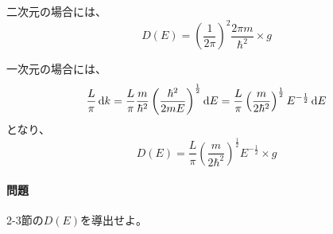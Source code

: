 \documentclass[titlepage]{ltjsarticle}
\begin{document}
二次元の場合には、
\begin{equation}
  D(E) = \left( \frac{1}{2\pi} \right)^2 \frac{2\pi m}{\hbar^2} \times g 
\end{equation}

一次元の場合には、
\begin{equation}
  \frac{L}{\pi} \odif{k} = \frac{L}{\pi} \frac{m}{\hbar^2} \left( \frac{\hbar^2}{2mE} \right)^{\frac{1}{2}} \odif{E} = \frac{L}{\pi} \left( \frac{m}{2 \hbar^2} \right)^{\frac{1}{2}}E^{-\frac{1}{2}} \odif{E}
\end{equation}
となり、
\begin{equation}
  D(E) = \frac{L}{\pi} \left( \frac{m}{2\hbar^2} \right)^{\frac{1}{2}} E^{-\frac{1}{2}} \times g
\end{equation}

\paragraph{問題}
2-3節の\(D(E)\)を導出せよ。
\end{document}
